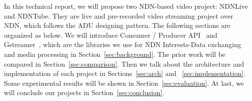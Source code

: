 In this technical report, we will propose two NDN-based video project: NDNLive and NDNTube. They are live and pre-recorded video streaming project over NDN, which follows the ADU designing pattern. The following sections are organized as below. We will introduce Consumer / Producer API~\cite{api-tr} and Gstreamer~\cite{gstreamer}, which are the libraries we use for NDN Interests-Data exchanging and media processing in Section~\ref{sec:background}. The prior work will be compared in Section~\ref{sec:comparison}. Then we talk about the architecture and implementation of each project in Sections~\ref{sec:arch} and ~\ref{sec:implementation}. Some experimental results will be shown in Section~\ref{sec:evaluation}. At last, we will conclude our projects in Section~\ref{sec:conclusion}.


